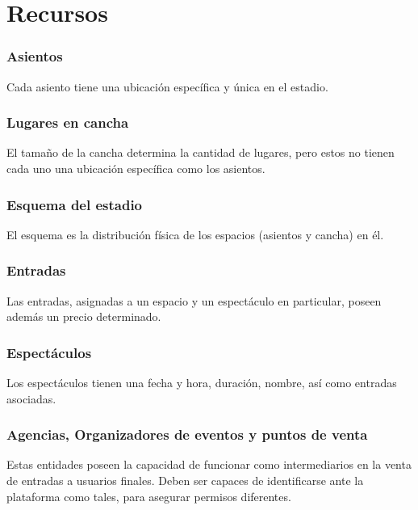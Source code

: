 \section{Recursos}

\subsubsection{Asientos}

Cada asiento tiene una ubicación específica y única en el estadio.

\subsubsection{Lugares en cancha}

El tamaño de la cancha determina la cantidad de lugares, pero estos no tienen
cada uno una ubicación específica como los asientos.

\subsubsection{Esquema del estadio}

El esquema es la distribución física de los espacios (asientos y cancha) en él.

\subsubsection{Entradas}

Las entradas, asignadas a un espacio y un espectáculo en particular, poseen
además un precio determinado.

\subsubsection{Espectáculos}\label{recurso:espectaculo}

Los espectáculos tienen una fecha y hora, duración, nombre, así como entradas asociadas.

\subsubsection{Agencias, Organizadores de eventos y puntos de venta}

Estas entidades poseen la capacidad de funcionar como intermediarios en la venta
de entradas a usuarios finales. Deben ser capaces de identificarse ante la
plataforma como tales, para asegurar permisos diferentes.

